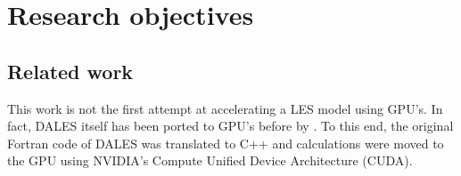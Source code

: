\section{Research objectives}


\subsection{Related work}

This work is not the first attempt at accelerating a LES model using GPU's. In fact, DALES itself has been ported to GPU's before by \citet{Schalkwijk2012}. To this end, the original Fortran code of DALES was translated to C++ and calculations were moved to the GPU using NVIDIA's Compute Unified Device Architecture (CUDA). 

